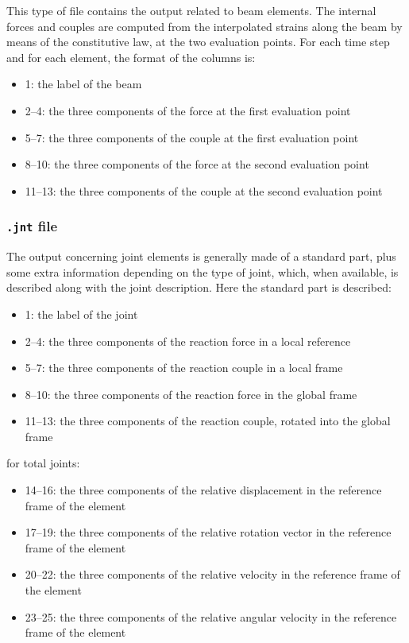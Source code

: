 This type of file  contains the output related to beam elements. The internal forces and couples are computed from the interpolated strains along the beam by means of the constitutive law, at the two evaluation points. For each time step and for each element, the format of the columns is:

\begin{itemize}
    \item 1: the label of the beam
    \item 2–4: the three components of the force at the first evaluation point
    \item 5–7: the three components of the couple at the first evaluation point
    \item 8–10: the three components of the force at the second evaluation point
    \item 11–13: the three components of the couple at the second evaluation point
\end{itemize}


\subsubsection{\texttt{.jnt} file}

The output concerning joint elements is generally made of a standard part, plus some extra information depending on the type of joint, which, when available, is described along with the joint description. Here the standard part is described:

\begin{itemize}
    \item 1: the label of the joint
    \item 2–4: the three components of the reaction force in a local reference
    \item 5–7: the three components of the reaction couple in a local frame
    \item 8–10: the three components of the reaction force in the global frame
    \item 11–13: the three components of the reaction couple, rotated into the global frame
\end{itemize}

for total joints:

\begin{itemize}
    \item 14–16: the three components of the relative displacement in the reference frame of the element
    \item 17–19: the three components of the relative rotation vector in the reference frame of the element
    \item 20–22: the three components of the relative velocity in the reference frame of the element
    \item 23–25: the three components of the relative angular velocity in the reference frame of the element
\end{itemize}

